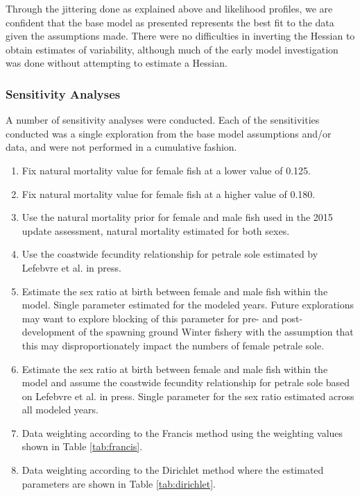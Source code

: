 \documentclass[12pt,]{article}
\begin{document}
Through the jittering done as explained above and likelihood profiles,
we are confident that the base model as presented represents the best
fit to the data given the assumptions made. There were no difficulties
in inverting the Hessian to obtain estimates of variability, although
much of the early model investigation was done without attempting to
estimate a Hessian.

\subsubsection{Sensitivity Analyses}\label{sensitivity-analyses}

A number of sensitivity analyses were conducted. Each of the
sensitivities conducted was a single exploration from the base model
assumptions and/or data, and were not performed in a cumulative fashion.

\begin{enumerate}

  \item Fix natural mortality value for female fish at a lower value of 0.125.
  
  \item Fix natural mortality value for female fish at a higher value of 0.180.
  
  \item Use the natural mortality prior for female and male fish used in the 2015 update assessment, natural mortality estimated for both sexes.
  
  \item Use the coastwide fecundity relationship for petrale sole estimated by Lefebvre et al. in press.
  
  \item Estimate the sex ratio at birth between female and male fish within the model. Single parameter estimated for the modeled years.  Future explorations may want to explore blocking of this parameter for pre- and post-development of the spawning ground Winter fishery with the assumption that this may disproportionately impact the numbers of female petrale sole.
  
  \item Estimate the sex ratio at birth between female and male fish within the model and assume the coastwide fecundity relationship for petrale sole based on Lefebvre et al. in press. Single parameter for the sex ratio estimated across all modeled years. 
  
  \item Data weighting according to the Francis method using the weighting values shown in Table \ref{tab:francis}. 
  
  \item Data weighting according to the Dirichlet method where the estimated parameters are shown in Table \ref{tab:dirichlet}. 
  
\end{enumerate}
\end{document}
